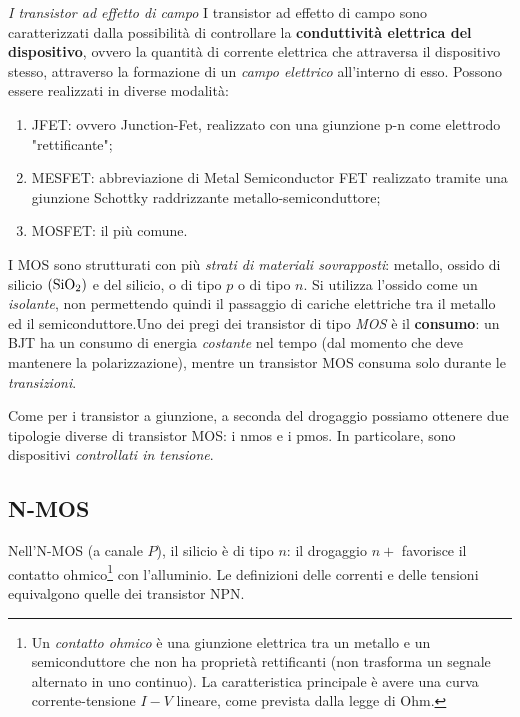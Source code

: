 \documentclass[
]{book}
\begin{document}
\begin{greenbox}{\emph{I transistor ad effetto di campo}}
I transistor ad effetto di campo sono caratterizzati dalla possibilità di controllare la \textbf{conduttività elettrica del dispositivo}, ovvero la quantità di corrente elettrica che attraversa il dispositivo stesso, attraverso la formazione di un \emph{campo elettrico}
all'interno di esso. \newline
Possono essere realizzati in diverse modalità: 
\begin{enumerate}
\item JFET: ovvero Junction-Fet, realizzato con una giunzione p-n come elettrodo "rettificante";
\item MESFET: abbreviazione di Metal Semiconductor FET realizzato tramite una giunzione Schottky raddrizzante metallo-semiconduttore; 
\item MOSFET: il più comune.
\end{enumerate}
\end{greenbox}

I MOS sono strutturati con più \emph{strati di materiali sovrapposti}:
metallo, ossido di silicio \((\ce{SiO_2})\) e del silicio, o di tipo
\(p\) o di tipo \(n\). Si utilizza l'ossido come un \emph{isolante}, non
permettendo quindi il passaggio di cariche elettriche tra il metallo ed
il semiconduttore.\newline Uno dei pregi dei transistor di tipo
\emph{MOS} è il \textbf{consumo}: un BJT ha un consumo di energia
\emph{costante} nel tempo (dal momento che deve mantenere la
polarizzazione), mentre un transistor MOS consuma solo durante le
\emph{transizioni}.

Come per i transistor a giunzione, a seconda del drogaggio possiamo
ottenere due tipologie diverse di transistor MOS: i nmos e i pmos.
\newline In particolare, sono dispositivi \emph{controllati in
tensione}.

\subsection{N-MOS}\label{n-mos}

Nell'N-MOS (a canale \(P\)), il silicio è di tipo \(n\): il drogaggio
\(n+\) favorisce il contatto ohmico\footnote{Un \emph{contatto ohmico} è
  una giunzione elettrica tra un metallo e un semiconduttore che non ha
  proprietà rettificanti (non trasforma un segnale alternato in uno
  continuo). La caratteristica principale è avere una curva
  corrente-tensione \(I-V\) lineare, come prevista dalla legge di Ohm.}
con l'alluminio. Le definizioni delle correnti e delle tensioni
equivalgono quelle dei transistor NPN.
\end{document}
